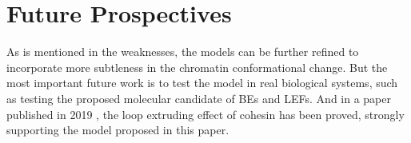 \documentclass[11pt]{article}
\begin{document}
\section{Future Prospectives}

As is mentioned in the weaknesses, the models can be further refined to incorporate more subtleness in the chromatin conformational change. But the most important future work is to test the model in real biological systems, such as testing the proposed molecular candidate of BEs and LEFs. And in a paper published in 2019 \cite{kim_human_2019}, the loop extruding effect of cohesin has been proved, strongly supporting the model proposed in this paper.

\printbibliography
\end{document}
